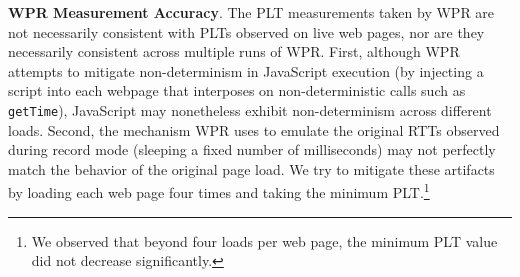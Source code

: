 \textbf{WPR Measurement Accuracy}. The PLT measurements taken by WPR are not necessarily consistent with PLTs observed on live web pages, nor are they necessarily consistent across multiple runs of WPR. First, although WPR attempts to mitigate non-determinism in JavaScript execution (by injecting a script into each webpage that interposes on non-deterministic calls such as \texttt{getTime}), JavaScript may nonetheless exhibit non-determinism across different loads. Second, the mechanism WPR uses to emulate the original RTTs observed during record mode  (sleeping a fixed number of milliseconds) may not perfectly match the behavior of the original page load.
\begingroup
\setcounter{savefootnote}{\value{footnote}}%
\setcounter{footnote}{2}%
\renewcommand{\thefootnote}{1}%
We try to mitigate these artifacts by loading each web page four times and
taking the minimum PLT.\footnote{We observed that beyond four loads per web page, the minimum PLT value did not decrease significantly.}
\setcounter{footnote}{\value{savefootnote}}%
\endgroup
